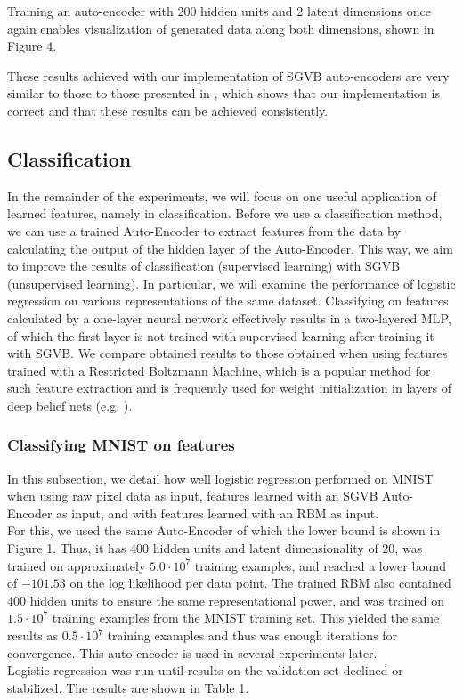 \documentclass{article}
\begin{document}
Training an auto-encoder with 200 hidden units and 2 latent dimensions once again enables visualization of generated data along both dimensions, shown in Figure 4.

These results achieved with our implementation of SGVB auto-encoders are very similar to those to those presented in \cite{kingma2013auto}, which shows that our implementation is correct and that these results can be achieved consistently. 

\subsection{Classification}

In the remainder of the experiments, we will focus on one useful application of learned features, namely in classification. Before we use a classification method, we can use a trained Auto-Encoder to extract features from the data by calculating the output of the hidden layer of the Auto-Encoder. This way, we aim to improve the results of classification (supervised learning) with SGVB (unsupervised learning). In particular, we will examine the performance of logistic regression on various representations of the same dataset. Classifying on features calculated by a one-layer neural network effectively results in a two-layered MLP, of which the first layer is not trained with supervised learning after training it with SGVB. We compare obtained results to those obtained when using features trained with a Restricted Boltzmann Machine, which is a popular method \cite{bengio2009learning} for such feature extraction and is frequently used for weight initialization in layers of deep belief nets (e.g. \cite{bengio2007greedy} ).

\subsubsection{Classifying MNIST on features}

In this subsection, we detail how well logistic regression performed on MNIST when using raw pixel data as input, features learned with an SGVB Auto-Encoder as input, and with features learned with an RBM as input. \\ For this, we used the same Auto-Encoder of which the lower bound is shown in Figure 1. Thus, it has 400 hidden units and latent dimensionality of 20, was trained on approximately $5.0\cdot 10^7$ training examples, and reached a lower bound of $-101.53$ on the log likelihood per data point. The trained RBM also contained 400 hidden units to ensure the same representational power, and was trained on $1.5\cdot 10^7$ training examples from the MNIST training set. This yielded the same results as $0.5\cdot 10^7$ training examples and thus was enough iterations for convergence. This auto-encoder is used in several experiments later. \\
Logistic regression was run until results on the validation set declined or stabilized. The results are shown in Table 1.
\end{document}
